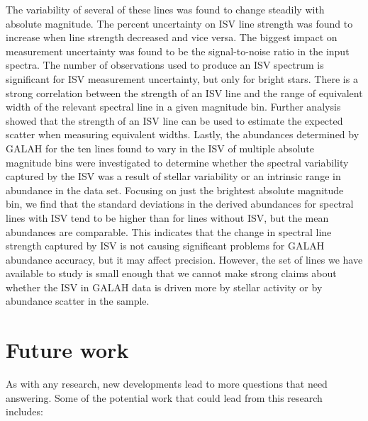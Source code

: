 The variability of several of these lines was found to change steadily with absolute magnitude. The percent  uncertainty on ISV line strength was found to increase when line strength decreased and vice versa. The biggest impact on measurement uncertainty was found to be the signal-to-noise ratio in the input spectra. The number of observations used to produce an ISV spectrum is significant for ISV measurement uncertainty, but only for bright stars. There is a strong correlation between the strength of an ISV line and the range of equivalent width of the relevant spectral line in a given magnitude bin. Further analysis showed that the strength of an ISV line can be used to estimate the expected scatter when measuring equivalent widths. Lastly, the abundances determined by GALAH for the ten lines found to vary in the ISV of multiple absolute magnitude bins were investigated to determine whether the spectral variability captured by the ISV was a result of stellar variability or an intrinsic range in abundance in the data set. Focusing on just the brightest absolute magnitude bin, we find that the standard deviations in the derived abundances for spectral lines with ISV tend to be higher than for lines without ISV, but the mean abundances are comparable. This indicates that the change in spectral line strength captured by ISV is not causing significant problems for GALAH abundance accuracy, but it may affect precision. However, the set of lines we have available to study is small enough that we cannot make strong claims about whether the ISV in GALAH data is driven more by stellar activity or by abundance scatter in the sample.\\

\section{Future work}
As with any research, new developments lead to more questions that need answering. Some of the potential work that could lead from this research includes:\\

